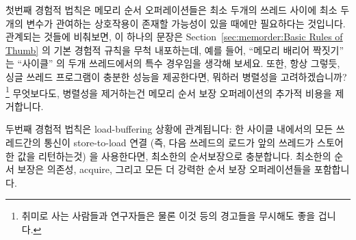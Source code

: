 첫번째 경험적 법칙은 메모리 순서 오퍼레이션들은 최소 두개의 쓰레드 사이에 최소
두개의 변수가 관여하는 상호작용이 존재할 가능성이 있을 때에만 필요하다는
것입니다.
관계되는 것들에 비춰보면, 이 하나의 문장은
Section~\ref{sec:memorder:Basic Rules of Thumb} 의 기본 경험적 규칙을 무척
내포하는데, 예를 들어, ``메모리 배리어 짝짓기'' 는 ``사이클'' 의 두개
쓰레드에서의 특수 경우임을 생각해 보세요.
또한, 항상 그렇듯, 싱글 쓰레드 프로그램이 충분한 성능을 제공한다면, 뭐하러
병렬성을 고려하겠습니까?\footnote{
	취미로 사는 사람들과 연구자들은 물론 이것 등의 경고들을 무시해도
	좋을 겁니다.}
무엇보다도, 병렬성을 제거하는건 메모리 순서 보장 오퍼레이션의 추가적 비용을
제거합니다.

두번째 경험적 법칙은 load-buffering 상황에 관계됩니다:
한 사이클 내에서의 모든 쓰레드간의 통신이 store-to-load 연결 (즉, 다음 쓰레드의
로드가 앞의 쓰레드가 스토어한 값을 리턴하는것) 을 사용한다면, 최소한의
순서보장으로 충분합니다.
최소한의 순서 보장은 의존성, acquire, 그리고 모든 더 강력한 순서 보장
오퍼레이션들을 포함합니다.

